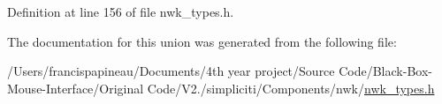 \-Definition at line 156 of file nwk\-\_\-types.\-h.



\-The documentation for this union was generated from the following file\-:\begin{DoxyCompactItemize}
\item 
/\-Users/francispapineau/\-Documents/4th year project/\-Source Code/\-Black-\/\-Box-\/\-Mouse-\/\-Interface/\-Original Code/\-V2./simpliciti/\-Components/nwk/\hyperlink{nwk__types_8h}{nwk\-\_\-types.\-h}\end{DoxyCompactItemize}
